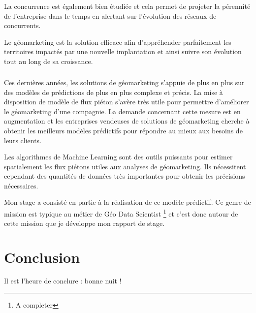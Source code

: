 \documentclass{themeensg}
\begin{document}
La concurrence est également bien étudiée et cela permet de projeter la pérennité de l’entreprise dans le temps en alertant sur l’évolution des réseaux de concurrents.

Le géomarketing est la solution efficace afin d’appréhender parfaitement les territoires impactés par une nouvelle implantation et ainsi suivre son évolution tout au long de sa croissance.

\paragraph*{}

Ces dernières années, les solutions de géomarketing s’appuie de plus en plus sur des modèles de prédictions de plus en plus complexe et précis. La mise à disposition de modèle de flux piéton s’avère très utile pour permettre d’améliorer le géomarketing d’une compagnie. La demande concernant cette mesure est en augmentation et les entreprises vendeuses de solutions de géomarketing cherche à obtenir les meilleurs modèles prédictifs pour répondre au mieux aux besoins de leurs clients.

Les algorithmes de Machine Learning sont des outils puissants pour estimer spatialement les flux piétons utiles aux analyses de géomarketing. Ils nécessitent cependant des quantités de données très importantes pour obtenir les précisions nécessaires.

Mon stage a consisté en partie à la réalisation de ce modèle prédictif. Ce genre de mission est typique au métier de Géo Data Scientist \footnote{A completer} et c’est donc autour de cette mission que je développe mon rapport de stage.











\chapter*{Conclusion}
  \vspace{1.5cm}
Il est l'heure de conclure : bonne nuit !
\end{document}
